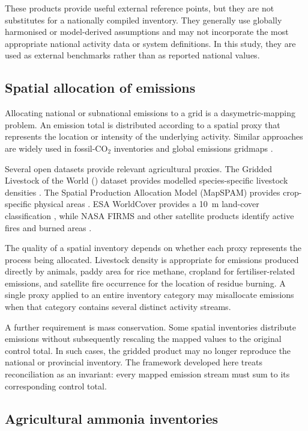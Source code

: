 These products provide useful external reference points, but they are not substitutes for a
nationally compiled inventory. They generally use globally harmonised or model-derived
assumptions and may not incorporate the most appropriate national activity data or system
definitions. In this study, they are used as external benchmarks rather than as reported
national values.

\subsection{Spatial allocation of emissions}

Allocating national or subnational emissions to a grid is a dasymetric-mapping problem. An
emission total is distributed according to a spatial proxy that represents the location or
intensity of the underlying activity. Similar approaches are widely used in fossil-CO$_2$
inventories and global emissions gridmaps \citep{oda2018,crippa2020}.

Several open datasets provide relevant agricultural proxies. The Gridded Livestock of the
World (\GLW{}) dataset provides modelled species-specific livestock densities
\citep{glw4,gilbert2018}. The Spatial Production Allocation Model (MapSPAM) provides
crop-specific physical areas \citep{mapspam2020}. ESA WorldCover provides a
\SI{10}{\metre} land-cover classification \citep{worldcover2021}, while NASA FIRMS and
other satellite products identify active fires and burned areas \citep{firms,giglio2016}.

The quality of a spatial inventory depends on whether each proxy represents the process
being allocated. Livestock density is appropriate for emissions produced directly by
animals, paddy area for rice methane, cropland for fertiliser-related emissions, and
satellite fire occurrence for the location of residue burning. A single proxy applied to an
entire inventory category may misallocate emissions when that category contains several
distinct activity streams.

A further requirement is mass conservation. Some spatial inventories distribute emissions
without subsequently rescaling the mapped values to the original control total. In such
cases, the gridded product may no longer reproduce the national or provincial inventory.
The framework developed here treats reconciliation as an invariant: every mapped emission
stream must sum to its corresponding control total.

\subsection{Agricultural ammonia inventories}

